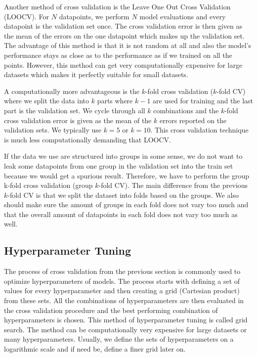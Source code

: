 \documentclass[11pt,oneside,czech,american]{book} %
\theoremstyle{definition} %
\theoremstyle{definition}
\begin{document}
Another method of cross validation is the Leave One Out Cross Validation (LOOCV). For $N$ datapoints, we perform $N$ model evaluations and every datapoint is the validation set once. The cross validation error is then given as the mean of the errors on the one datapoint which makes up the validation set. The advantage of this method is that it is not random at all and also the model's performance stays as close as to the performance as if we trained on all the points. However, this method can get very computationally expensive for large datasets which makes it perfectly suitable for small datasets.

A computationally more advantageous is the $k$-fold cross validation ($k$-fold CV) where we split the data into $k$ parts where $k-1$ are used for training and the last part is the validation set. We cycle through all $k$ combinations and the $k$-fold cross validation error is given as the mean of the $k$ errors reported on the validation sets. We typically use $k = 5$ or $k = 10$. This cross validation technique is much less computationally demanding that LOOCV.

If the data we use are structured into groups in some sense, we do not want to leak some datapoints from one group in the validation set into the train set because we would get a spurious result. Therefore, we have to perform the group k-fold cross validation (group $k$-fold CV). The main difference from the previous $k$-fold CV is that we split the dataset into folds based on the groups. We also should make sure the amount of groups in each fold does not vary too much and that the overall amount of datapoints in each fold does not vary too much as well.

\subsection{Hyperparameter Tuning}
The process of cross validation from the previous section is commonly used to optimize hyperparameters of models. The process starts with defining a set of values for every hyperparameter and then creating a grid (Cartesian product) from these sets. All the combinations of hyperparameters are then evaluated in the cross validation procedure and the best performing combination of hyperparameters is chosen. This method of hyperparameter tuning is called grid search. The method can be computationally very expensive for large datasets or many hyperparameters. Usually, we define the sets of hyperparameters on a logarithmic scale and if need be, define a finer grid later on.
\end{document}
